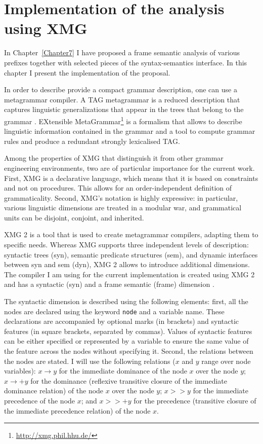 
\chapter{Implementation of the analysis using XMG} %
\label{Chapter8}
In Chapter~\ref{Chapter7} I have proposed a frame semantic analysis of various prefixes together with selected pieces of the syntax-semantics interface. In this chapter I present the implementation of the proposal.

 In order to describe provide a compact grammar description, one can use a metagrammar compiler. A TAG metagrammar is a reduced description that captures linguistic generalizations that appear in the trees that belong to the grammar \citep{Candito:99}. EXtensible MetaGrammar\footnote{\url{http://xmg.phil.hhu.de/}} \citep[XMG][]{Crabbe:13} is a formalism that allows to describe linguistic information contained in the grammar and a tool to compute grammar rules and produce a redundant strongly lexicalised TAG. 
 
Among the properties of XMG that distinguish it from other grammar engineering environments, two are of particular importance for the current work. First, XMG is a declarative language, which means that it is based on constraints and not on procedures. This allows for an order-independent definition of grammaticality. Second, XMG's notation is highly expressive: in particular, various linguistic dimensions are treated in a modular war, and grammatical units can be disjoint, conjoint, and inherited.
 
 XMG 2 \citep{Petitjean:16} is a tool that is used to create metagrammar compilers, adapting them to specific needs. Whereas XMG supports three independent levels of description: syntactic trees (syn), semantic predicate structures (sem), and dynamic interfaces between syn and sem (dyn), XMG 2 allows to introduce additional dimensions. The compiler I am using for the current implementation is created using XMG 2 and has a syntactic (syn) and a frame semantic (frame) dimension  \citep{Lichte:15}.

The syntactic dimension is described using the following elements: first, all the nodes are declared using the keyword \texttt{node} and a variable name. These declarations are accompanied by optional marks (in brackets) and syntactic features (in square brackets, separated by commas). Values of syntactic features can be either specified or represented by a variable to ensure the same value of the feature across the nodes without specifying it. Second, the relations between the nodes are stated. I will use the following relations ($x$ and $y$ range over node variables): $x \rightarrow y$ for the immediate dominance of the node $x$ over the node $y$; $x \rightarrow + y$ for the dominance (reflexive transitive closure of the immediate dominance relation) of the node $x$ over the node $y$; 
$x >> y$ for the immediate precedence of the node $x$; and $x >>+ y$ for the precedence (transitive closure of the immediate precedence relation) of the node $x$.

